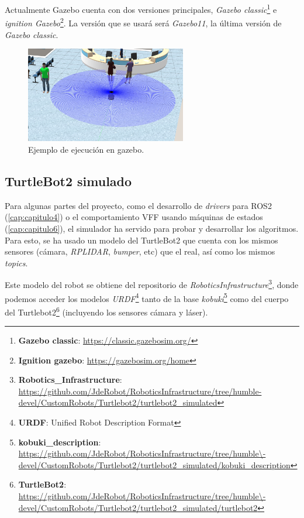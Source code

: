 Actualmente Gazebo cuenta con dos versiones principales, \textit{Gazebo classic}\footnote{\textbf{Gazebo classic}: \url{https://classic.gazebosim.org/}} e
\textit{ignition Gazebo}\footnote{\textbf{Ignition gazebo}: \url{https://gazebosim.org/home}}. La versión que se usará será \textit{Gazebo11}, la última
versión de \textit{Gazebo classic}.

\begin{figure} [H]
    \begin{center}
        \includegraphics[width=7cm]{figs/c3/gazebo_sim.png}
    \end{center}
    \caption[Simulador Gazebo.]{Ejemplo de ejecución en gazebo.}
    \label{fig:gazebo_example}
\end{figure}

\subsection{TurtleBot2 simulado}
\label{subsec:turtlebot2_sim}

Para algunas partes del proyecto, como el desarrollo de \textit{drivers} para ROS2 (\ref{cap:capitulo4}) o el comportamiento VFF usando
máquinas de estados (\ref{cap:capitulo6}), el simulador ha servido para probar y desarrollar los algoritmos. Para esto, se ha usado un modelo del
TurtleBot2 que cuenta con los mismos sensores (cámara, \textit{RPLIDAR}, \textit{bumper}, etc) que el real, así como los mismos \textit{topics}.

Este modelo del robot se obtiene del repositorio de
\textit{RoboticsInfrastructure}\footnote{\textbf{Robotics\_Infrastructure}: \url{
    https://github.com/JdeRobot/RoboticsInfrastructure/tree/humble-devel/CustomRobots/Turtlebot2/turtlebot2_simulated}},
donde podemos acceder los modelos \textit{URDF}\footnote{\textbf{URDF}: Unified Robot Description Format} tanto de la base
\textit{kobuki}\footnote{\textbf{kobuki\_description}:\url{
    https://github.com/JdeRobot/RoboticsInfrastructure/tree/humble\-devel/CustomRobots/Turtlebot2/turtlebot2_simulated/kobuki_description}}
como del cuerpo del Turtlebot2\footnote{\textbf{TurtleBot2}: \url{
    https://github.com/JdeRobot/RoboticsInfrastructure/tree/humble\-devel/CustomRobots/Turtlebot2/turtlebot2_simulated/turtlebot2}}
(incluyendo los sensores cámara y láser).

